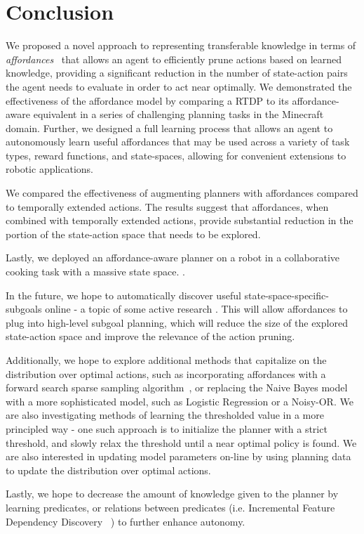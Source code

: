 \documentclass[conference]{IEEEtran}
\newcommand{\dnote}[1]{\textcolor{Green}{\textbf{}}}
\begin{document}
\section{Conclusion}
\label{sec:conclusion}
\dnote{Conclusion could use some work/rewriting}
We proposed a novel approach to representing transferable knowledge in terms of
{\em affordances}~\cite{gibson77} that allows an agent to efficiently prune actions 
based on learned knowledge, providing a significant reduction in the number of state-action
pairs the agent needs to evaluate in order to act near optimally. We demonstrated the 
effectiveness of the affordance model by comparing a RTDP to its affordance-aware
equivalent in a series of challenging planning tasks in the Minecraft domain. Further, we designed
a full learning process that allows an agent to autonomously learn useful affordances that may be used
across a variety of task types, reward functions, and state-spaces, allowing for convenient extensions 
to robotic applications.

We compared the effectiveness of augmenting planners with affordances compared to 
temporally extended actions. The results suggest that affordances, when combined with 
temporally extended actions, provide substantial reduction in the portion of the state-action 
space that needs to be explored.

Lastly, we deployed an affordance-aware planner on a robot in a collaborative cooking task with a massive 
state space. \dnote{Need to flesh out once we have more detail}.

In the future, we hope to automatically discover useful state-space-specific-subgoals online 
- a topic of some active research \cite{Mcgovern01automaticdiscovery,Simsek:2005:IUS:1102351.1102454}.
This will allow affordances to plug into high-level subgoal planning, which will reduce the size of the 
explored state-action space and improve the relevance of the action pruning. 

Additionally, we hope to explore additional methods that capitalize on the distribution over optimal actions,
such as incorporating affordances with a forward search sparse sampling algorithm~\cite{walsh2010integrating},
or replacing the Naive Bayes model with a more sophisticated model, such as Logistic Regression or a Noisy-OR.
We are also investigating methods of learning the thresholded value in a more principled way - one such
approach is to initialize the planner with a strict threshold, and slowly relax the threshold until a near optimal
policy is found. We are also interested in updating model parameters on-line by using planning data to update
the distribution over optimal actions. 

Lastly, we hope to decrease the amount of knowledge given to the planner by learning predicates, or relations between predicates (i.e. Incremental Feature Dependency Discovery ~\cite{ICML2011Geramifard_473}) to further enhance autonomy.

{\small


}
\end{document}
